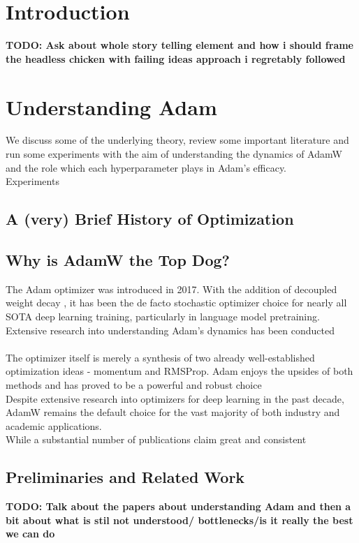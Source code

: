 \documentclass[12pt]{book}
\newcommand{\todo}[1]{{\color{red}\bf{TODO: #1}}}
\begin{document}
\chapter{Introduction}
\todo{Ask about whole story telling element and how i should frame the headless chicken with failing ideas approach i regretably followed}



\chapter{Understanding Adam}
\label{chap: Understanding Adam}
We discuss some of the underlying theory, review some important literature and run some experiments with the aim of understanding the dynamics of AdamW and the role which each hyperparameter plays in Adam's efficacy.\\
Experiments 
\section{A (very) Brief History of Optimization}
\section{Why is AdamW the Top Dog?}
The Adam optimizer \cite{kingma2017adammethodstochasticoptimization}  was introduced in 2017. With the addition of decoupled weight decay \cite{loshchilov2019decoupledweightdecayregularization}, it has been the de facto stochastic optimizer choice for nearly all SOTA deep learning training, particularly in language model pretraining. Extensive research into understanding Adam's dynamics has been conducted  \\
\\
The optimizer itself is merely a synthesis of two already well-established optimization ideas - momentum and RMSProp. Adam enjoys the upsides of both methods and has proved to be a powerful and robust choice   \\
Despite extensive research into optimizers for deep learning in the past decade, AdamW remains the default choice for the vast majority of both industry and academic applications. \\
While a substantial number of publications claim great and consistent  
\section{Preliminaries and Related Work}
\todo{Talk about the papers about understanding Adam and then a bit about what is stil not understood/ bottlenecks/is it really the best we can do}
\end{document}
